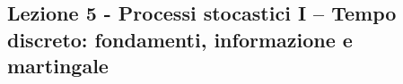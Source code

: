 \documentclass[12pt,a4paper]{article}%
\newcommand{\E}{\mathbb{E}}
\newcommand{\G}{\mathcal{G}}
\newcommand{\1}{\mathbf{1}}
\begin{document}


\subsection{Lezione 5 - Processi stocastici I -- Tempo discreto: fondamenti, informazione e
martingale}
\end{document}
